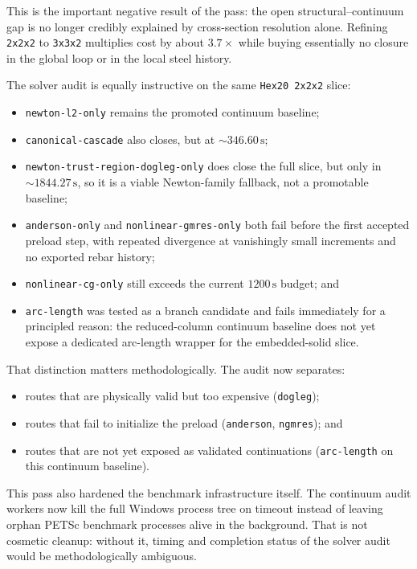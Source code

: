 This is the important negative result of the pass: the open
structural--continuum gap is no longer credibly explained by cross-section
resolution alone. Refining \texttt{2x2x2} to \texttt{3x3x2} multiplies cost by
about \(3.7\times\) while buying essentially no closure in the global loop or
in the local steel history.

The solver audit is equally instructive on the same \texttt{Hex20 2x2x2}
slice:
\begin{itemize}
  \item \texttt{newton-l2-only} remains the promoted continuum baseline;
  \item \texttt{canonical-cascade} also closes, but at
    \(\sim 346.60\,\mathrm{s}\);
  \item \texttt{newton-trust-region-dogleg-only} does close the full slice,
    but only in \(\sim 1844.27\,\mathrm{s}\), so it is a viable Newton-family
    fallback, not a promotable baseline;
  \item \texttt{anderson-only} and \texttt{nonlinear-gmres-only} both fail
    before the first accepted preload step, with repeated divergence at
    vanishingly small increments and no exported rebar history;
  \item \texttt{nonlinear-cg-only} still exceeds the current
    \(1200\,\mathrm{s}\) budget; and
  \item \texttt{arc-length} was tested as a branch candidate and fails
    immediately for a principled reason: the reduced-column continuum baseline
    does not yet expose a dedicated arc-length wrapper for the embedded-solid
    slice.
\end{itemize}

That distinction matters methodologically. The audit now separates:
\begin{itemize}
  \item routes that are physically valid but too expensive
    (\texttt{dogleg});
  \item routes that fail to initialize the preload
    (\texttt{anderson}, \texttt{ngmres}); and
  \item routes that are not yet exposed as validated continuations
    (\texttt{arc-length} on this continuum baseline).
\end{itemize}

This pass also hardened the benchmark infrastructure itself. The continuum
audit workers now kill the full Windows process tree on timeout instead of
leaving orphan PETSc benchmark processes alive in the background. That is not
cosmetic cleanup: without it, timing and completion status of the solver audit
would be methodologically ambiguous.

